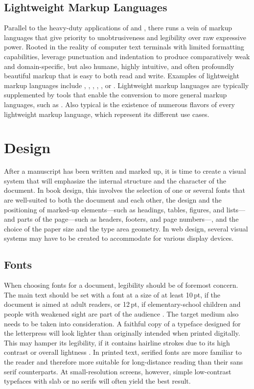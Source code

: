 \documentclass[
  a5paper,10pt,           %
  dvipsnames              %
]{book}
\begin{document}
\section{Lightweight Markup Languages}
Parallel to the heavy-duty applications of  and ,
there runs a vein of markup languages that give priority to unobtrusiveness and
legibility over raw expressive power. Rooted in the reality of computer text
terminals with limited formatting capabilities,  leverage punctuation and indentation to produce comparatively weak and
domain-specific, but also humane, highly intuitive, and often profoundly
beautiful markup that is easy to both read and write. Examples of lightweight
markup languages include , , ,
, , or .  Lightweight markup languages
are typically supplemented by tools that enable the conversion to more general
markup languages, such as . Also typical is the existence of
numerous flavors of every lightweight markup language, which represent its
different use cases.

\chapter{Design}
\nocite{beran14}
After a manuscript has been written and marked up, it is time to create a visual
system that will emphasize the internal structure and the character of the
document. In book design, this involves the selection of one or several fonts
that are well-suited to both the document and each other, the design and the
positioning of marked-up elements---such as headings, tables, figures, and
lists---and parts of the page---such as headers, footers, and page numbers---,
and the choice of the paper size and the type area geometry. In web design,
several visual systems may have to be created to accommodate for various display
devices.

\section{Fonts}
When choosing fonts for a document, legibility should be of foremost concern.
The main text should be set with a font at a size of at least 10\,pt, if the
document is aimed at adult readers, or 12\,pt, if elementary-school children and
people with weakened sight are part of the audience
\cite[para.\,13--15]{kapr99}. The target medium also needs to be taken into
consideration. A faithful copy of a typeface designed for the letterpress will
look lighter than originally intended when printed digitally. This may hamper
its legibility, if it contains hairline strokes due to its high contrast or
overall lightness \cite[sec.~6.1.2]{bringhurst92}. In printed text, serified
fonts are more familiar to the reader and therefore more suitable for
long-distance reading than their sans serif counterparts. At small-resolution
screens, however, simple low-contrast typefaces with slab or no serifs will
often yield the best result.
\end{document}
